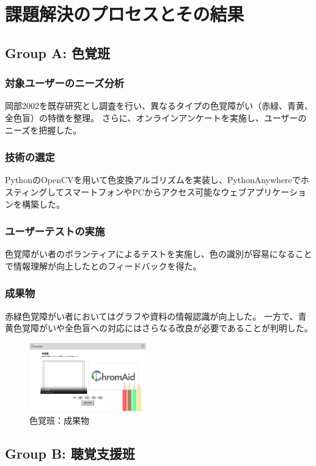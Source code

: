 \section{課題解決のプロセスとその結果}
\subsection{Group A: 色覚班}
\subsubsection{対象ユーザーのニーズ分析}
岡部2002\cite{okabe2002color}を既存研究とし調査を行い、異なるタイプの色覚障がい（赤緑、青黄、全色盲）の特徴を整理。
さらに、オンラインアンケートを実施し、ユーザーのニーズを把握した。
\subsubsection{技術の選定}
PythonのOpenCVを用いて色変換アルゴリズムを実装し、PythonAnywhereでホスティングしてスマートフォンやPCからアクセス可能なウェブアプリケーションを構築した。
\subsubsection{ユーザーテストの実施}
色覚障がい者のボランティアによるテストを実施し、色の識別が容易になることで情報理解が向上したとのフィードバックを得た。
\subsubsection{成果物}
赤緑色覚障がい者においてはグラフや資料の情報認識が向上した。
一方で、青黄色覚障がいや全色盲への対応にはさらなる改良が必要であることが判明した。
\begin{figure}[h]
  \centering
  \includegraphics[width=0.45\textwidth]{pages/report/images/ChromAid.png}
  \caption{色覚班：成果物}
  \label{fig:ColorVisionApp}
\end{figure}

\subsection{Group B: 聴覚支援班}
